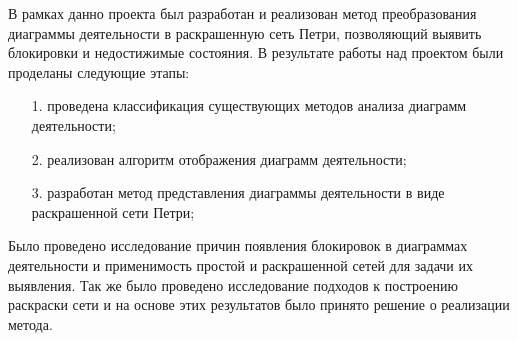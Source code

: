\Conclusion

В рамках данно проекта был разработан и реализован метод преобразования диаграммы деятельности в раскрашенную сеть Петри, позволяющий выявить блокировки и недостижимые состояния. В результате работы над проектом были проделаны следующие этапы:
\begin{enumerate}
\item[1.] проведена классификация существующих методов анализа диаграмм деятельности;
\item[2.] реализован алгоритм отображения диаграмм деятельности;
\item[3.] разработан метод представления диаграммы деятельности в виде раскрашенной сети Петри;
\end{enumerate}

Было проведено исследование причин появления блокировок в диаграммах деятельности и применимость простой и раскрашенной сетей для задачи их выявления. Так же было проведено исследование подходов к построению раскраски сети и на основе этих результатов было принято решение о реализации метода.